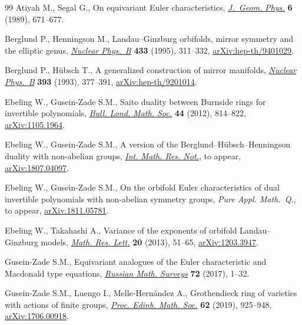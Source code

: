 \documentclass[11pt]{article}
\numberwithin{equation}{section}
\numberwithin{equation}{section}
\begin{document}
\begin{thebibliography}{99}
Atiyah M., Segal G., On equivariant {E}uler characteristics, \href{https://doi.org/10.1016/0393-0440(89)90032-6}{\textit{J.~Geom.
 Phys.}} \textbf{6} (1989), 671--677.

Berglund P., Henningson M., Landau--{G}inzburg orbifolds, mirror symmetry and
 the elliptic genus, \href{https://doi.org/10.1016/0550-3213(94)00389-V}{\textit{Nuclear Phys.~B}} \textbf{433} (1995), 311--332,
 \href{https://arxiv.org/abs/hep-th/9401029}{arXiv:hep-th/9401029}.

Berglund P., H\"ubsch T., A generalized construction of mirror manifolds,
 \href{https://doi.org/10.1016/0550-3213(93)90250-S}{\textit{Nuclear Phys.~B}} \textbf{393} (1993), 377--391,
 \href{https://arxiv.org/abs/hep-th/9201014}{arXiv:hep-th/9201014}.

Ebeling W., Gusein-Zade S.M., Saito duality between {B}urnside rings for
 invertible polynomials, \href{https://doi.org/10.1112/blms/bds014}{\textit{Bull. Lond. Math. Soc.}} \textbf{44} (2012),
 814--822, \href{https://arxiv.org/abs/1105.1964}{arXiv:1105.1964}.

Ebeling W., Gusein-Zade S.M., A version of the
 {B}erglund--{H}\"ubsch--{H}enningson duality with non-abelian groups,
 \href{https://doi.org/10.1093/imrn/rnz167}{\textit{Int. Math. Res. Not.}}, {t}o appear, \href{https://arxiv.org/abs/1807.04097}{arXiv:1807.04097}.

Ebeling W., Gusein-Zade S.M., On the orbifold {E}uler characteristics of dual
 invertible polynomials with non-abelian symmetry groups, \textit{Pure Appl.
 Math.~Q.}, {t}o appear, \href{https://arxiv.org/abs/1811.05781}{arXiv:1811.05781}.

Ebeling W., Takahashi A., Variance of the exponents of orbifold
 {L}andau--{G}inzburg models, \href{https://doi.org/10.4310/MRL.2013.v20.n1.a5}{\textit{Math. Res. Lett.}} \textbf{20} (2013),
 51--65, \href{https://arxiv.org/abs/1203.3947}{arXiv:1203.3947}.

Gusein-Zade S.M., Equivariant analogues of the {E}uler characteristic and
 {M}acdonald type equations, \href{https://doi.org/10.4213/rm9748}{\textit{Russian Math. Surveys}} \textbf{72} (2017), 1--32.

Gusein-Zade S.M., Luengo I., Melle-Hern\'andez A., Grothendieck ring of
 varieties with actions of finite groups, \href{https://doi.org/10.1017/s001309151900004x}{\textit{Proc. Edinb. Math. Soc.}} \textbf{62} (2019), 925--948, \href{https://arxiv.org/abs/1706.00918}{arXiv:1706.00918}.


\end{thebibliography}
\end{document}
